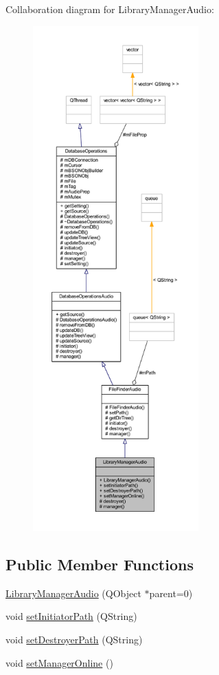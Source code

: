Collaboration diagram for Library\-Manager\-Audio\-:
\nopagebreak
\begin{figure}[H]
\begin{center}
\leavevmode
\includegraphics[height=550pt]{class_library_manager_audio__coll__graph}
\end{center}
\end{figure}
\subsection*{Public Member Functions}
\begin{DoxyCompactItemize}
\item 
\hyperlink{class_library_manager_audio_a8d54634f0bbf37a513a74ca37f753777}{Library\-Manager\-Audio} (Q\-Object $\ast$parent=0)
\item 
void \hyperlink{class_library_manager_audio_a3f71d69d66a6b666e02171349950ee8a}{set\-Initiator\-Path} (Q\-String)
\item 
void \hyperlink{class_library_manager_audio_a5c1d68b8e484b208dbf43aaf97807e69}{set\-Destroyer\-Path} (Q\-String)
\item 
void \hyperlink{class_library_manager_audio_aeeb16a8820789dcd1680331707c7c72e}{set\-Manager\-Online} ()
\end{DoxyCompactItemize}
